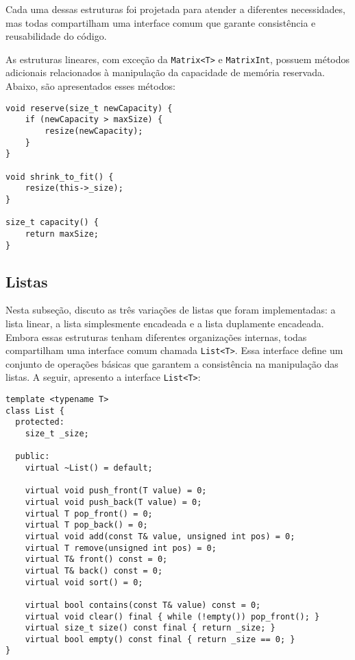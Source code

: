 \documentclass[12pt]{article}
\begin{document}
Cada uma dessas estruturas foi projetada para atender a diferentes necessidades, mas todas compartilham uma interface comum que garante consistência e reusabilidade do código. 

As estruturas lineares, com exceção da \texttt{Matrix<T>} e \texttt{MatrixInt}, possuem métodos adicionais relacionados à manipulação da capacidade de memória reservada. Abaixo, são apresentados esses métodos:

\begin{verbatim}
void reserve(size_t newCapacity) {
    if (newCapacity > maxSize) {
        resize(newCapacity);
    }
}

void shrink_to_fit() {
    resize(this->_size);
}

size_t capacity() {
    return maxSize;
}
\end{verbatim}

\newpage %

\subsection{Listas}

Nesta subseção, discuto as três variações de listas que foram implementadas: a lista linear, a lista simplesmente encadeada e a lista duplamente encadeada. Embora essas estruturas tenham diferentes organizações internas, todas compartilham uma interface comum chamada \texttt{List<T>}. Essa interface define um conjunto de operações básicas que garantem a consistência na manipulação das listas. A seguir, apresento a interface \texttt{List<T>}:

\begin{verbatim}
template <typename T>
class List {
  protected:
    size_t _size;
    
  public:
    virtual ~List() = default;
    
    virtual void push_front(T value) = 0;
    virtual void push_back(T value) = 0;
    virtual T pop_front() = 0;
    virtual T pop_back() = 0;
    virtual void add(const T& value, unsigned int pos) = 0;
    virtual T remove(unsigned int pos) = 0;
    virtual T& front() const = 0;
    virtual T& back() const = 0;
    virtual void sort() = 0;
    
    virtual bool contains(const T& value) const = 0;
    virtual void clear() final { while (!empty()) pop_front(); }
    virtual size_t size() const final { return _size; }
    virtual bool empty() const final { return _size == 0; }
}
\end{verbatim}
\end{document}
